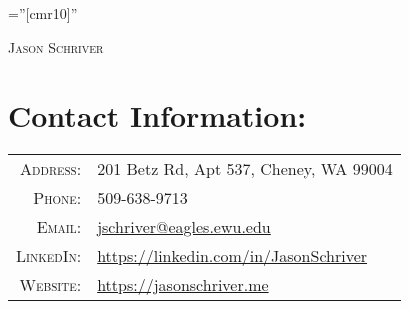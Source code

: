 \documentclass[a4paper,10pt]{article}
\begin{document}

\pagestyle{empty} %

\font\fb=''[cmr10]'' %

{\begin{center}
\textsc		{\Large Jason Schriver}
\end{center}}

\section{Contact Information:}
\begin{tabular}{rl}
    \textsc{Address:}   & 201 Betz Rd, Apt 537, Cheney, WA 99004 \\
    \textsc{Phone:}     & 509-638-9713\\
    \textsc{Email:}     & \href{mailto:jschriver@eagles.ewu.edu}{jschriver@eagles.ewu.edu}\\
    \textsc{LinkedIn:}  & \href{https://linkedin.com/in/JasonSchriver}{https://linkedin.com/in/JasonSchriver}\\
    \textsc{Website:}   & \href{https://jasonschriver.me}{https://jasonschriver.me}
\end{tabular}

\end{document}
